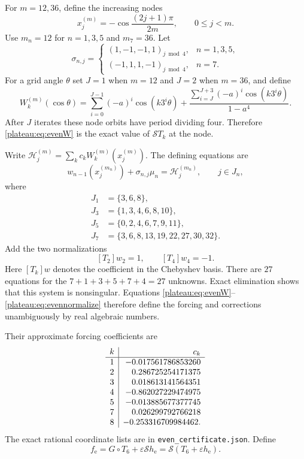 \documentclass[11pt]{article}
\theoremstyle{remark}\newtheorem{remark}[theorem]{Remark}
\newcommand{\eps}{\varepsilon}
\begin{document}
For $m=12,36$, define the increasing nodes
\[
 x_j^{(m)}=-\cos\frac{(2j+1)\pi}{2m},\qquad0\le j<m.
\]
Use $m_n=12$ for $n=1,3,5$ and $m_7=36$. Let
\[
 \sigma_{n,j}=\begin{cases}
 (1,-1,-1,1)_{j\bmod4},&n=1,3,5,\\
 (-1,1,1,-1)_{j\bmod4},&n=7.
 \end{cases}
\]
For a grid angle $\theta$ set $J=1$ when $m=12$ and $J=2$ when $m=36$,
and define
\begin{equation}\label{plateau:eq:evenW}
 W_k^{(m)}(\cos\theta)=
 \sum_{i=0}^{J-1}(-a)^i\cos(k3^i\theta)
 +\frac{\sum_{i=J}^{J+3}(-a)^i\cos(k3^i\theta)}{1-a^4}.
\end{equation}
After $J$ iterates these node orbits have period dividing four. Therefore
\eqref{plateau:eq:evenW} is the exact value of $\mathcal S T_k$ at the node.

Write $\mathcal H_j^{(m)}=\sum_k c_k W_k^{(m)}(x_j^{(m)})$.
The defining equations are
\begin{equation}\label{plateau:eq:evenlinear}
 w_{n-1}(x_j^{(m_n)})+\sigma_{n,j}\mu_n
 =\mathcal H_j^{(m_n)},\qquad j\in J_n,
\end{equation}
where
\begin{align*}
 J_1&=\{3,6,8\},\\
 J_3&=\{1,3,4,6,8,10\},\\
 J_5&=\{0,2,4,6,7,9,11\},\\
 J_7&=\{3,6,8,13,19,22,27,30,32\}.
\end{align*}
Add the two normalizations
\begin{equation}\label{plateau:eq:evennormalize}
 [T_2]w_2=1,\qquad [T_4]w_4=-1.
\end{equation}
Here $[T_k]w$ denotes the coefficient in the Chebyshev basis.
There are $27$ equations for the $7+1+3+5+7+4=27$ unknowns.
Exact elimination shows that this system is nonsingular. Equations
\eqref{plateau:eq:evenW}--\eqref{plateau:eq:evennormalize} therefore define the forcing
and corrections unambiguously by real algebraic numbers.

Their approximate forcing coefficients are
\[
\begin{array}{c|r}
 k&c_k\\\hline
 1&-0.017561786853260\cr
 2& 0.286725254171375\cr
 3& 0.018613141564351\cr
 4&-0.862027229474975\cr
 5&-0.013885677377745\cr
 7& 0.026299792766218\cr
 8&-0.253316709984462.
\end{array}
\]
The exact rational coordinate lists are in \texttt{even\_certificate.json}.
Define
\begin{equation}\label{plateau:eq:fe}
 f_{\mathrm{e}}=G\circ T_6+\eps\mathcal S h_{\mathrm{e}}
 =\mathcal S(T_6+\eps h_{\mathrm{e}}).
\end{equation}
\end{document}
